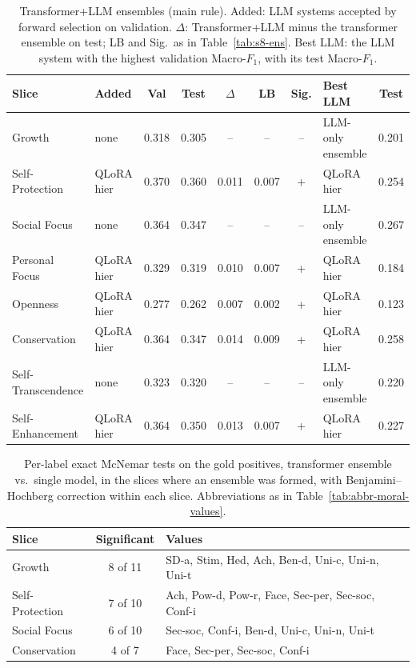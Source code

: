 \begin{table}[!htbp]
\centering
\scriptsize
\caption{Transformer+LLM ensembles (main rule). Added: LLM systems accepted by forward selection on validation. $\Delta$: Transformer+LLM minus the transformer ensemble on test; LB and Sig.\ as in Table~\ref{tab:s8-ens}. Best LLM: the LLM system with the highest validation Macro-$F_1$, with its test Macro-$F_1$.}
\label{tab:s8-hybrid}
\begin{tabularx}{\textwidth}{lXccccclc}
\hline
\textbf{Slice} & \textbf{Added} & \textbf{Val} & \textbf{Test} & \textbf{$\Delta$} & \textbf{LB} & \textbf{Sig.} & \textbf{Best LLM} & \textbf{Test} \\
\hline
Growth & none & 0.318 & 0.305 & -- & -- & -- & LLM-only ensemble & 0.201 \\
Self-Protection & QLoRA hier & 0.370 & 0.360 & 0.011 & 0.007 & + & QLoRA hier & 0.254 \\
Social Focus & none & 0.364 & 0.347 & -- & -- & -- & LLM-only ensemble & 0.267 \\
Personal Focus & QLoRA hier & 0.329 & 0.319 & 0.010 & 0.007 & + & QLoRA hier & 0.184 \\
Openness & QLoRA hier & 0.277 & 0.262 & 0.007 & 0.002 & + & QLoRA hier & 0.123 \\
Conservation & QLoRA hier & 0.364 & 0.347 & 0.014 & 0.009 & + & QLoRA hier & 0.258 \\
Self-Transcendence & none & 0.323 & 0.320 & -- & -- & -- & LLM-only ensemble & 0.220 \\
Self-Enhancement & QLoRA hier & 0.364 & 0.350 & 0.013 & 0.007 & + & QLoRA hier & 0.227 \\
\hline
\end{tabularx}
\end{table}

\begin{table}[!htbp]
\centering
\footnotesize
\caption{Per-label exact McNemar tests on the gold positives, transformer ensemble vs.\ single model, in the slices where an ensemble was formed, with Benjamini--Hochberg correction within each slice. Abbreviations as in Table~\ref{tab:abbr-moral-values}.}
\label{tab:s8-ens-mcnemar}
\begin{tabularx}{\textwidth}{lcX}
\hline
\textbf{Slice} & \textbf{Significant} & \textbf{Values} \\
\hline
Growth & 8 of 11 & SD-a, Stim, Hed, Ach, Ben-d, Uni-c, Uni-n, Uni-t \\
Self-Protection & 7 of 10 & Ach, Pow-d, Pow-r, Face, Sec-per, Sec-soc, Conf-i \\
Social Focus & 6 of 10 & Sec-soc, Conf-i, Ben-d, Uni-c, Uni-n, Uni-t \\
Conservation & 4 of 7 & Face, Sec-per, Sec-soc, Conf-i \\
\hline
\end{tabularx}
\end{table}


